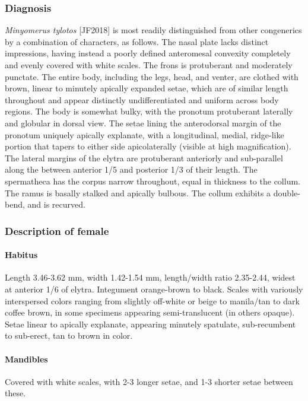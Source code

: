 \documentclass[fleqn,10pt,lineno]{wlpeerj} %
\begin{document}
		\subsubsection*{Diagnosis}
			\textit{Minyomerus tylotos} [JF2018] is most readily distinguished from other congenerics by a combination of characters, as follows.
			The nasal plate lacks distinct impressions, having instead a poorly defined anteromesal convexity completely and evenly covered with white scales.
			The frons is protuberant and moderately punctate.
			The entire body, including the legs, head, and venter, are clothed with brown, linear to minutely apically expanded setae, which are of similar length throughout and appear distinctly undifferentiated and uniform across body regions.
			The body is somewhat bulky, with the pronotum protuberant laterally and globular in dorsal view.
			The setae lining the anterodorsal margin of the pronotum uniquely apically explanate, with a longitudinal, medial, ridge-like portion that tapers to either side apicolaterally (visible at high magnification).
			The lateral margins of the elytra are protuberant anteriorly and sub-parallel along the between anterior 1/5 and posterior 1/3 of their length.
			The spermatheca has the corpus narrow throughout, equal in thickness to the collum.
			The ramus is basally stalked and apically bulbous.
			The collum exhibits a double-bend, and is recurved.
		\subsubsection*{Description of female}
			\paragraph{Habitus}
				Length 3.46-3.62 mm, width 1.42-1.54 mm, length/width ratio 2.35-2.44, widest at anterior 1/6 of elytra.
				Integument orange-brown to black.
				Scales with variously interspersed colors ranging from slightly off-white or beige to manila/tan to dark coffee brown, in some specimens appearing semi-translucent (in others opaque).
				Setae linear to apically explanate, appearing minutely spatulate, sub-recumbent to sub-erect, tan to brown in color.
			\paragraph{Mandibles}
				Covered with white scales, with 2-3 longer setae, and 1-3 shorter setae between these.
\end{document}
